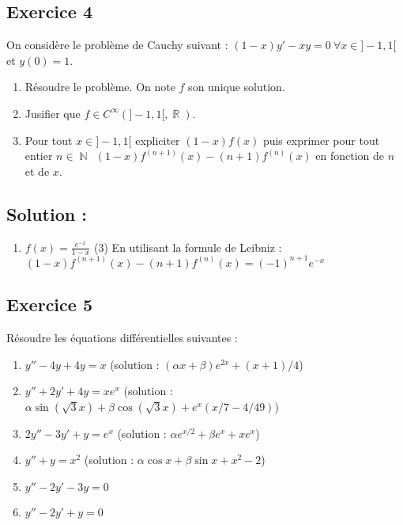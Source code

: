 \documentclass{article}
\DeclareMathOperator{\R}{\mathbb{R}}
\DeclareMathOperator{\N}{\mathbb{N}}
\begin{document}
\subsection*{Exercice 4} 

On considère le problème de Cauchy suivant : $(1-x)y' - xy = 0 \ \forall x\in ]-1, 1[$ et $y(0) = 1$. 
\begin{enumerate}
    \item Résoudre le problème. On note $f$ son unique solution. 

    \item Jusifier que $f \in C^{\infty}(]-1, 1[, \R)$. 

    \item Pour tout $x \in ]-1, 1[$ expliciter $(1-x)f(x)$ puis exprimer pour tout entier $n\in \N \ \ (1-x)f^{(n+1)}(x) - (n+1)f^{(n)}(x)$ en fonction de $n$ et de $x$. 
\end{enumerate}

\subsection*{Solution :} 

\begin{enumerate}
    \item  $f(x) = \displaystyle\frac{e^{-x}}{1-x}$ (3) En utilisant la formule de Leibniz : $(1-x)f^{(n+1)}(x) - (n+1)f^{(n)}(x) = (-1)^{n+1}e^{-x}$ 
\end{enumerate}

\subsection*{Exercice 5} 

Résoudre les équations différentielles suivantes :

\begin{enumerate}
   \item$y'' - 4y + 4y = x$ (solution : $(\alpha x + \beta)e^{2x} + (x+1)/4$)
\item$y'' + 2y' + 4y = xe^x$ (solution : $\alpha \sin(\sqrt{3}x) + \beta \cos(\sqrt{3}x) + e^x(x/7  - 4/49)$)
\item$2y'' - 3y' + y = e^x$ (solution : $\alpha e^{x/2} + \beta e^{x} + xe^x$) 
\item$y'' + y = x^2$ (solution : $\alpha \cos{x} + \beta \sin{x} + x^2 - 2$)
\item$y'' - 2y' - 3y = 0$ 
\item$y'' - 2y' + y = 0$  

\end{enumerate}
\end{document}
